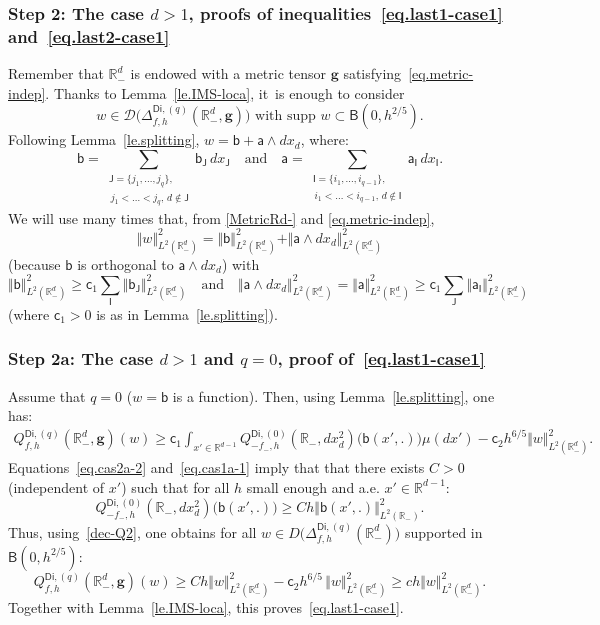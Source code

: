 \documentclass[10pt]{amsart}
\newcommand{\quand}{\quad\text{and}\quad}
\newcommand{\mbf}[1]{\mathbf{#1}}
\theoremstyle{plain}
\theoremstyle{definition}
\begin{document}
\subsubsection*{Step 2: The case $d>1$, proofs of
inequalities~\eqref{eq.last1-case1} and~\eqref{eq.last2-case1}}
Remember that $\mathbb R^d_-$ is endowed with a metric tensor $ \mbf
g$ satisfying~\eqref{eq.metric-indep}. Thanks to
Lemma~\ref{le.IMS-loca}, it~is enough to consider
\[
w\in \mathcal D \bigl(\Delta^{\mathsf{Di},(q)}_{f,h}(\mathbb R_-^d,
\mbf g)\bigr) \text{ with supp } w\subset \mathsf B(0,h^{2/5}).
\]
Following Lemma~\ref{le.splitting}, $w=\mathsf b + \mathsf a \wedge dx_d$, where:\[
\mathsf b =\sum_{\substack{\mathsf J=\{j_1,\ldots,j_q\},\\ \, j_1<\ldots<j_q, \, d\notin \mathsf J} } \mathsf b_{\mathsf J}\, dx_{\mathsf J} \quand \mathsf a =\sum_{\substack{\mathsf I=\{i_1,\ldots,i_{q-1}\},\\ \, i_1<\ldots<i_{q-1}, \, d\notin \mathsf I }} \mathsf a_{\mathsf I}\, dx_{\mathsf I}.
\]
We will use many times that, from \ref{MetricRd-} and \eqref{eq.metric-indep},
\[
\Vert w \Vert_{L^2(\mathbb R^d_-)}^2= \Vert \mathsf b
\Vert_{L^2(\mathbb R^d_-)}^2+ \Vert \mathsf a \wedge dx_d
\Vert_{L^2(\mathbb R^d_-)}^2
\]
(because $\mathsf b $ is orthogonal
to $\mathsf a \wedge dx_d$) with
\[
\Vert \mathsf b
\Vert_{L^2(\mathbb R^d_-)}^2\ge \mathsf c_1 \sum_{\mathsf I}
\Vert \mathsf b_{\mathsf J} \Vert_{L^2(\mathbb R^d_-)}^2\quand \Vert \mathsf a \wedge dx_d \Vert_{L^2(\mathbb R^d_-)}^2 \! =\! \Vert \mathsf a \Vert_{L^2(\mathbb R^d_-)}^2 \!\ge \! \mathsf c_1 \sum_{\mathsf J} \Vert \mathsf a_{\mathsf I} \Vert_{L^2(\mathbb R^d_-)}^2
\]
(where $\mathsf c_1 >0$ is as in Lemma~\ref{le.splitting}).

\subsubsection*{Step 2a: The case $d>1$ and $q= 0$, proof of~\eqref{eq.last1-case1}}
Assume that $q= 0$ (\ie $w=\mathsf b$ is a function). Then, using Lemma~\ref{le.splitting}, one has:
\begin{align}\label{dec-Q2}
Q^{\mathsf{Di},(q)}_{f,h}(\mathbb R^{d}_-, \mbf g)(w)\!\ge\! \mathsf
c_1\!\! \int_{x'\in \mathbb R^{d-1} } \!\!\! \!\!\! \!\!\! \! Q^{\mathsf{Di},(0)}_{-f_-,h}(\mathbb R_-,dx_d^2)\bigl(\mathsf b(x',.)\bigr) \mu(dx')-\mathsf c_2h^{6/5} \Vert w \Vert_{L^2(\mathbb R^d_-)}^2.
\end{align}
Equations~\eqref{eq.cas2a-2} and~\eqref{eq.cas1a-1} imply that that there exists $C>0$ (independent of $x'$) such that for all $h$ small enough and a.e. $x'\in \mathbb R^{d-1}$:
\[
Q^{\mathsf{Di},(0)}_{-f_-,h}(\mathbb R_-,dx_d^2)\bigl(\mathsf b (x',.)\bigr) \ge Ch \Vert \mathsf b (x',.) \Vert_{L^2(\mathbb R_-)}^2.
\]
Thus, using~\eqref{dec-Q2}, one obtains for all $w\in D\bigl(\Delta_{f,h}^{\mathsf{Di},(q)}(\mathbb R_-^d) \bigr)$ supported in $\mathsf B(0,h^{2/5 })$:
\[
Q^{\mathsf{Di},(q)}_{f,h}(\mathbb R_-^d, \mbf g)(w)\ge Ch \Vert w \Vert_{L^2(\mathbb R^d_-)}^2-\mathsf c_2h^{6/5}\, \Vert w \Vert_{L^2(\mathbb R^d_-)}^2\ge ch \Vert w \Vert_{L^2(\mathbb R^d_-)}^2.
\]
Together with Lemma~\ref{le.IMS-loca}, this proves~\eqref{eq.last1-case1}.
\end{document}
